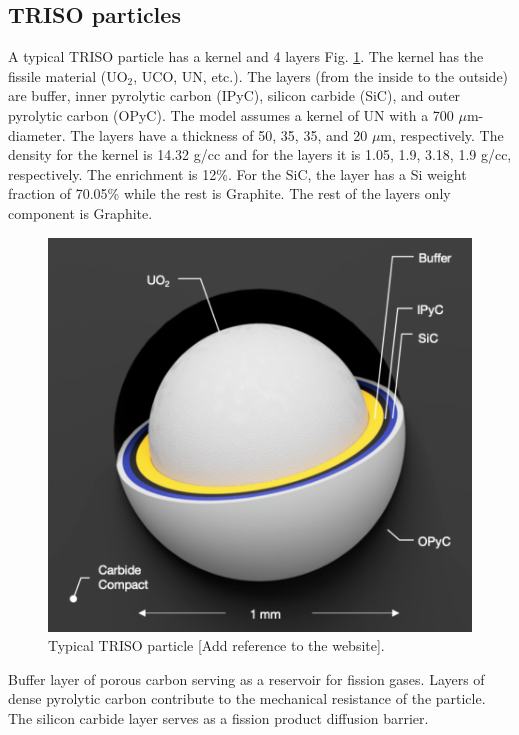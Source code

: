\subsection{TRISO particles}

A typical TRISO particle has a kernel and 4 layers Fig. \ref{fig:triso}. The kernel has the fissile material (UO$_2$, UCO, UN, etc.). The layers (from the inside to the outside) are buffer, inner pyrolytic carbon (IPyC), silicon carbide (SiC), and outer pyrolytic carbon (OPyC).
The model assumes a kernel of UN with a 700 $\mu$m-diameter. The layers have a thickness of 50, 35, 35, and 20 $\mu$m, respectively.
The density for the kernel is 14.32 g/cc and for the layers it is 1.05, 1.9, 3.18, 1.9 g/cc, respectively. The enrichment is 12\%. For the SiC, the layer has a Si weight fraction of 70.05\% while the rest is Graphite. The rest of the layers only component is Graphite.

\begin{figure}[H]
	\centering
	\includegraphics[width=0.5\linewidth]{figures/triso1.png}
	\hfill
	\caption{Typical TRISO particle [Add reference to the website].}
	\label{fig:triso}
\end{figure}

Buffer layer of porous carbon serving as a reservoir for fission gases.
Layers of dense pyrolytic carbon contribute to the mechanical resistance of the particle.
The silicon carbide layer serves as a fission product diffusion barrier.
\cite{france_gas-cooled_2006}